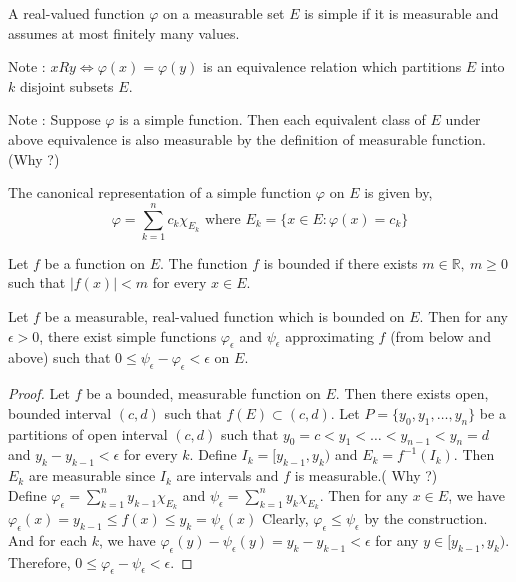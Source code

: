 \begin{definition}
	A real-valued function $\varphi$ on a measurable set $E$ is simple if it is measurable and assumes at most finitely many values.
\end{definition}

Note : $xRy \iff \varphi(x) = \varphi(y)$ is an equivalence relation which partitions $E$ into $k$ disjoint subsets $E$.

Note : Suppose $\varphi$ is a simple function.
Then each equivalent class of $E$ under above equivalence is also measurable by the definition of measurable function.(Why ?)

\begin{definition}
	The canonical representation of a simple function $\varphi$ on $E$ is given by,
	\begin{equation}
		\varphi = \sum_{k=1}^n c_k \chi_{E_k} \text{ where } E_k = \{ x \in E : \varphi(x) = c_k \} 
	\end{equation}
\end{definition}

\begin{definition}[bounded]
	Let $f$ be a function on $E$.
	The function $f$ is bounded if there exists $m \in \mathbb{R},\ m \ge 0$ such that $|f(x)| < m$ for every $x \in E$.
\end{definition}

\begin{lemma}
	Let $f$ be a measurable, real-valued function which is bounded on $E$.
	Then for any $\epsilon > 0$, there exist simple functions $\varphi_\epsilon$ and $\psi_\epsilon$  approximating $f$ (from below and above) such that $0 \le \psi_\epsilon - \varphi_\epsilon < \epsilon$ on $E$.
\end{lemma}
\begin{proof}
	Let $f$ be a bounded, measurable function on $E$.
	Then there exists open, bounded interval $(c,d)$ such that $f(E) \subset (c,d)$.
	Let $P = \{y_0,y_1,\dots,y_n\}$ be a partitions of open interval $(c,d)$ such that $y_0 =c < y_1 < \dots < y_{n-1} < y_n = d$ and $y_k - y_{k-1} < \epsilon$ for every $k$.
	Define $I_k = [y_{k-1},y_k)$ and $E_k = f^{-1}(I_k)$.
	Then $E_k$ are measurable since $I_k$ are intervals and $f$ is measurable.({ \color{blue}Why ?})\\

	Define $\displaystyle \varphi_\epsilon = \sum_{k=1}^n y_{k-1} \chi_{E_k}$ and $\displaystyle \psi_\epsilon = \sum_{k=1}^n y_k \chi_{E_k}$.
	Then for any $x \in E$, we have $\varphi_\epsilon(x) = y_{k-1} \le f(x) \le y_k = \psi_\epsilon(x)$
	Clearly, $\varphi_\epsilon \le \psi_\epsilon$ by the construction.
	And for each $k$, we have $\varphi_\epsilon(y) - \psi_\epsilon(y) = y_k - y_{k-1} < \epsilon$ for any $y \in [y_{k-1},y_k)$.
	Therefore, $0 \le \varphi_\epsilon - \psi_\epsilon < \epsilon$.
\end{proof}

